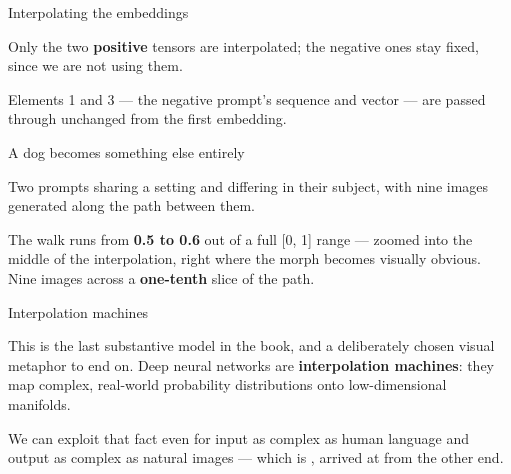 \documentclass[aspectratio=169,11pt,t]{beamer}
\begin{document}
\begin{frame}[shrink=25]{Interpolating the embeddings}
{\fontsize{9.4}{12.6}\selectfont\color{fg2}Only the two \textbf{positive} tensors are interpolated; the negative ones stay fixed, since we are not using them.\par}\vskip 4pt
{\fontsize{9.4}{12.6}\selectfont\color{fg2}Elements 1 and 3 --- the negative prompt's sequence and vector --- are passed through unchanged from the first embedding.\par}\vskip 4pt
\end{frame}

\begin{frame}[shrink=25]{A dog becomes something else entirely}
{\fontsize{9.4}{12.6}\selectfont\color{fg2}Two prompts sharing a setting and differing in their subject, with nine images generated along the path between them.\par}\vskip 4pt
{\fontsize{9.4}{12.6}\selectfont\color{fg2}The walk runs from \textbf{0.5 to 0.6} out of a full [0, 1] range --- zoomed into the middle of the interpolation, right where the morph becomes visually obvious. Nine images across a \textbf{one-tenth} slice of the path.\par}\vskip 4pt
\end{frame}

\begin{frame}[shrink=25]{Interpolation machines}
\begin{iquote}
\end{iquote}
{\fontsize{9.4}{12.6}\selectfont\color{fg2}This is the last substantive model in the book, and a deliberately chosen visual metaphor to end on. Deep neural networks are \textbf{interpolation machines}: they map complex, real-world probability distributions onto low-dimensional manifolds.\par}\vskip 4pt
\begin{iband}[signal]
We can exploit that fact even for input as complex as human language and output as complex as natural images --- which is , arrived at from the other end.
\end{iband}
\end{frame}
\end{document}
